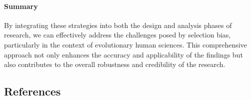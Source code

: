 \documentclass[
  singlecolumn,
  9pt]{article}
\let\oldparagraph\paragraph
\renewcommand{\paragraph}[1]{\oldparagraph{#1}\mbox{}}
\begin{document}
\paragraph{Summary}\label{summary}

By integrating these strategies into both the design and analysis phases
of research, we can effectively address the challenges posed by
selection bias, particularly in the context of evolutionary human
sciences. This comprehensive approach not only enhances the accuracy and
applicability of the findings but also contributes to the overall
robustness and credibility of the research.

\subsection*{References}\label{references}
\end{document}
